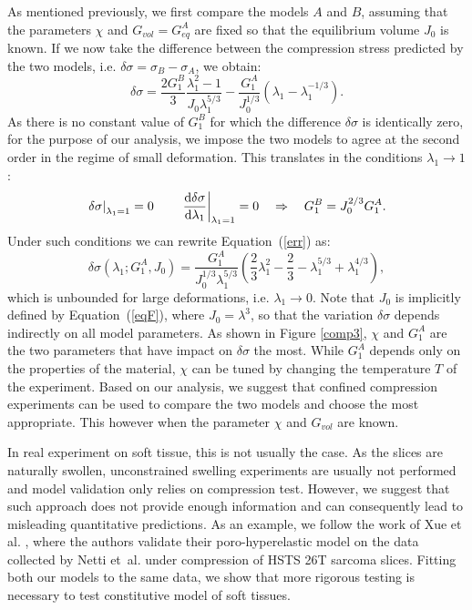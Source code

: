 As mentioned previously, we first compare the models $A$ and $B$, assuming that the parameters $\chi$ and $G_{vol}=G^A_{eq}$ are fixed so that the equilibrium volume $J_0$ is known. If we now take the difference between the compression stress predicted by the two models, i.e. $\delta \sigma= \sigma_{B}-\sigma_{A}$, we obtain:
\begin{equation}
\delta \sigma = \frac{2 G_1^{B}}{3} \frac{\lambda_1^2-1}{J_0\lambda_1^{5/3}} - \frac{G_1^A}{J_0^{1/3}}(\lambda_1-\lambda_1^{-1/3}).\label{err}
\end{equation}
As there is no constant value of $G^{B}_1$ for which the difference $\delta \sigma$ is identically zero, for the purpose of our analysis, we impose the two models to agree at the second order in the regime of small deformation. This translates in the conditions $\lambda_1\rightarrow 1$:
\begin{equation}
\left.\delta \sigma\right|_{\lambda_1=1}=0 \qquad \left.\frac{\text{d} \delta \sigma}{\text{d} \lambda_1}\right|_{\lambda_1=1}=0 \quad\Rightarrow \quad G_1^{B} = J_0^{2/3}G_1^A.
\end{equation}
Under such conditions we can rewrite Equation~(\ref{err}) as:
\begin{equation}
\delta \sigma(\lambda_1;G^A_1,J_0) = \frac{G_1^A}{J^{1/3}_0\lambda_1^{5/3}} \left(\frac{2}{3}\lambda^2_1-\frac{2}{3}-\lambda_1^{5/3}+\lambda_1^{4/3}\right), 
\end{equation}
which is unbounded for large deformations, i.e. $\lambda_1\rightarrow0$. Note that $J_0$ is implicitly defined by Equation~(\ref{eqF}), where $J_0=\lambda^3$, so that the variation $\delta\sigma$ depends indirectly on all model parameters. As shown in Figure \ref{comp3}, $\chi$ and $G_1^A$ are the two parameters that have impact on $\delta\sigma$ the most. While $G_1^A$ depends only on the properties of the material, $\chi$ can be tuned by changing the temperature $T$ of the experiment. Based on our analysis, we suggest that confined compression experiments can be used to compare the two models and choose the most appropriate. This however when the parameter $\chi$ and $G_{vol}$ are known. 

In real experiment on soft tissue, this is not usually the case. As the slices are naturally swollen, unconstrained swelling experiments are usually not performed and model validation only relies on compression test. However, we suggest that such approach does not provide enough information and can consequently lead to misleading quantitative predictions. As an example, we follow the work of Xue et al. \cite{ecm2}, where the authors validate their poro-hyperelastic model on the data collected by Netti et~al. \cite{Netti} under compression of HSTS 26T sarcoma slices. Fitting both our models to the same data, we show that more rigorous testing is necessary to test constitutive model of soft tissues.
